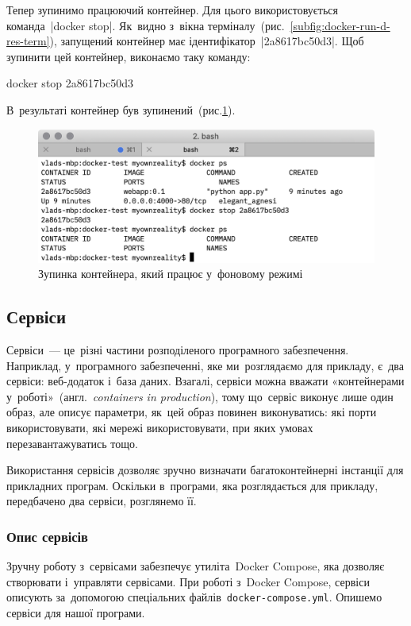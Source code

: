 \documentclass[
	a4paper,
	oneside,
	BCOR = 10mm,
	DIV = 12,
	12pt,
	headings = normal,
]{scrartcl}
\newlength{\gridunitwidth}
\newcommand{\filename}[1]{\texttt{#1}}
\newcommand{\transeng}[1]{{англ.}~\textit{\textenglish{#1}}}
\begin{document}
					Тепер зупинимо працюючий контейнер. Для цього використовується команда~\bashinline|docker stop|. Як~видно з~вікна терміналу~(рис.~\ref{subfig:docker-run-d-res-term}), запущений контейнер має ідентифікатор~\bashinline|2a8617bc50d3|. Щоб зупинити цей контейнер, виконаємо таку команду:
					\begin{bashterm}
						docker stop 2a8617bc50d3
					\end{bashterm}
					В~результаті контейнер був зупинений~(рис.\ref{fig:docker-stop-res}).

					\begin{figure}[!htbp]
						\centering
						\includegraphics[width=10\gridunitwidth]{./assets/y03s02-syssoft-homework-01-p05.png}
						\caption{Зупинка контейнера, який працює у~фоновому режимі}
						\label{fig:docker-stop-res}
					\end{figure}

			\subsection{Сервіси}
				Сервіси~— це~різні частини розподіленого програмного забезпечення. Наприклад, у~програмного забезпеченні, яке ми~розглядаємо для прикладу, є~два сервіси: веб-додаток і~база даних. Взагалі, сервіси можна вважати «контейнерами у~роботі»~(\transeng{containers in production}), тому що~сервіс виконує лише один образ, але описує параметри, як~цей образ повинен виконуватись: які порти використовувати, які мережі використовувати, при яких умовах перезавантажуватись тощо.

				Використання сервісів дозволяє зручно визначати багатоконтейнерні інстанції для прикладних програм. Оскільки в~програми, яка розглядається для прикладу, передбачено два сервіси, розглянемо її.

				\subsubsection{Опис сервісів}
					Зручну роботу з~сервісами забезпечує утиліта~\textenglish{Docker Compose}, яка дозволяє створювати і~управляти сервісами. При роботі з~\textenglish{Docker Compose}, сервіси описують за~допомогою спеціальних файлів~\filename{\textenglish{docker-compose.yml}}. Опишемо сервіси для нашої програми.
\end{document}
